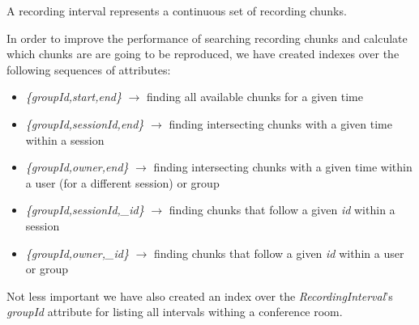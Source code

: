 A recording interval represents a continuous set of recording chunks.

In order to improve the performance of searching recording chunks and calculate which chunks are are going to be reproduced, we have created indexes over the following sequences of attributes: 
\begin{itemize}
    \item{\emph{\{groupId,start,end\}} $\rightarrow$ finding all available chunks for a given time} 
    \item{\emph{\{groupId,sessionId,end\}} $\rightarrow$ finding intersecting chunks with a given time within a session}
    \item{\emph{\{groupId,owner,end\}} $\rightarrow$ finding intersecting chunks with a given time within a user (for a different session) or group}
    \item{\emph{\{groupId,sessionId,\_id\}} $\rightarrow$ finding chunks that follow a given \emph{id} within a session}
    \item{\emph{\{groupId,owner,\_id\}} $\rightarrow$ finding chunks that follow a given \emph{id} within a user or group}
\end{itemize}

Not less important we have also created an index over the \emph{RecordingInterval}'s \emph{groupId} attribute for listing all intervals withing a conference room. 